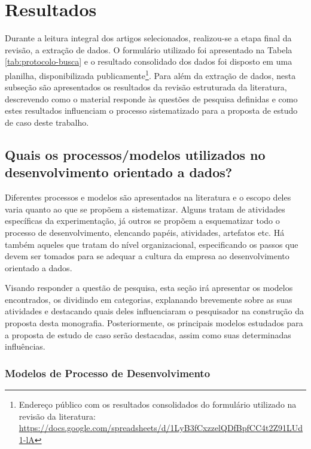 \section{Resultados}
\label{sec:rsl-resultados}

Durante a leitura integral dos artigos selecionados, realizou-se a etapa final da revisão, a extração de dados. O formulário utilizado foi apresentado na Tabela \ref{tab:protocolo-busca} e o resultado consolidado dos dados foi disposto em uma planilha, disponibilizada publicamente\footnote{Endereço público com os resultados consolidados do formulário utilizado na revisão da literatura: \href{https://docs.google.com/spreadsheets/d/1LyB3fCxzzelQDfBpfCC4t2Z91LUd1-lA/edit?usp=sharing&ouid=105055060757466273844&rtpof=true&sd=true}{https://docs.google.com/spreadsheets/d/1LyB3fCxzzelQDfBpfCC4t2Z91LUd1-lA}}. Para além da extração de dados, nesta subseção são apresentados os resultados da revisão estruturada da literatura, descrevendo como o material responde às questões de pesquisa definidas e como estes resultados influenciam o processo sistematizado para a proposta de estudo de caso deste trabalho.

\subsection{Quais os processos/modelos utilizados no desenvolvimento orientado a dados?}

Diferentes processos e modelos são apresentados na literatura e o escopo deles varia quanto ao que se propõem a sistematizar. Alguns tratam de atividades específicas da experimentação, já outros se propõem a esquematizar todo o processo de desenvolvimento, elencando papéis, atividades, artefatos etc. Há também aqueles que tratam do nível organizacional, especificando os passos que devem ser tomados para se adequar a cultura da empresa ao desenvolvimento orientado a dados.

Visando responder a questão de pesquisa, esta seção irá apresentar os modelos encontrados, os dividindo em categorias, explanando brevemente sobre as suas atividades e destacando quais deles influenciaram o pesquisador na construção da proposta desta monografia. Posteriormente, os principais modelos estudados para a proposta de estudo de caso serão destacadas, assim como suas determinadas influências.


\subsubsection{Modelos de Processo de Desenvolvimento}


